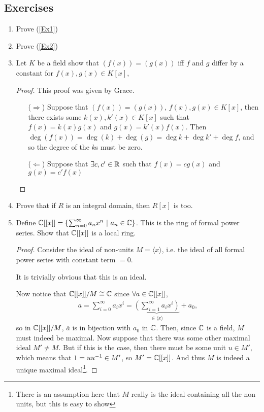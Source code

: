 \documentclass[12pt, twosided]{article}
\begin{document}
\subsection{Exercises}
\begin{enumerate}
\item Prove (\ref{Ex1})
\item Prove (\ref{Ex2})
\item Let \(K\) be a field show that \((f(x)) = (g(x))\) iff \(f\) and \(g\) differ by a constant for \(f(x), g(x) \in K[x]\),
  \begin{proof} This proof was given by Grace.
    \begin{enumerate} 
    \item [(\(\Rightarrow\))]Suppose that \((f(x)) = (g(x))\), \(f(x), g(x) \in K[x]\), then there exists some \(k(x), k\prime(x) \in K[x]\) such that \(f(x) = k(x)g(x)\) and \(g(x) = k\prime(x)f(x)\). Then \(\deg(f(x)) = \deg(k) + \deg(g) = \deg k + \deg k\prime + \deg f\), and so the degree of the \(k\)s must be zero.
    \item [(\(\Leftarrow\))] Suppose that \(\exists c, c\prime \in \R\) such that \(f(x) = cg(x)\) and \(g(x) = c\prime f(x)\)
    \end{enumerate}
  \end{proof}
\item Prove that if \(R\) is an integral domain, then \(R[x]\) is too.

\item Define \(\mathbb{C}[[x]] = \left\{ \sum_{n=0}^\infty a_nx^n \ \middle\vert\  a_n \in \mathbb{C}\right\}\). This is the ring of formal power series. Show that \(\mathbb{C}[[x]]\) is a local ring.

  \begin{proof}
    Consider the ideal of non-units \(M = \langle x \rangle\), i.e. the ideal of all formal power series with constant term \(= 0\).

    It is trivially obvious that this is an ideal.

    Now notice that \(\mathbb{C}[[x]]/M \cong \mathbb{C}\) since \(\forall a \in \mathbb{C}[[x]]\),
    \begin{align*}
      a = \sum_{i=0}^\infty a_ix^i = \underbrace{\left(\sum_{i = 1}^\infty a_ix^i\right)}_{\in \langle x \rangle} + a_0,
    \end{align*}
    so in \(\mathbb{C}[[x]]/M\), \(\overline{a}\) is in bijection with \(a_0\) in \(\mathbb{C}\). Then, since \(\mathbb{C}\) is a field, \(M\) must indeed be maximal. Now suppose that there was some other maximal ideal \(M\prime \neq M\). But if this is the case, then there must be some unit \(u \in M\prime\), which means that \(1 = uu\1 \in M\prime\), so \(M\prime = \C[[x]]\). And thus \(M\) is indeed a unique maximal ideal\footnote{There is an assumption here that \(M\) really is the ideal containing all the non units, but this is easy to show}.
  \end{proof}
\end{enumerate}
\end{document}
